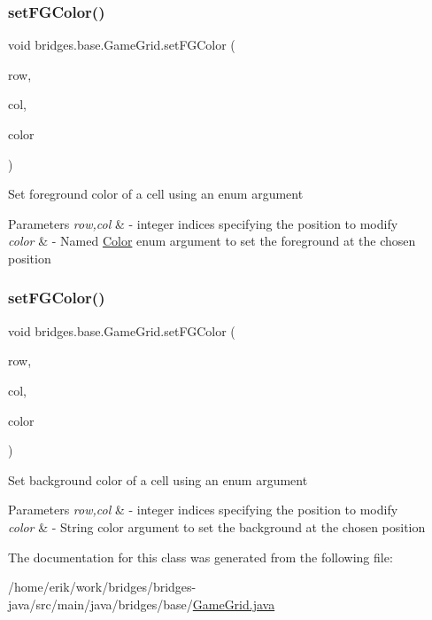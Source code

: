 \subsubsection{\texorpdfstring{set\+F\+G\+Color()}{setFGColor()}\hspace{0.1cm}{\footnotesize\ttfamily [1/2]}}
{\footnotesize\ttfamily void bridges.\+base.\+Game\+Grid.\+set\+F\+G\+Color (\begin{DoxyParamCaption}\item[{Integer}]{row,  }\item[{Integer}]{col,  }\item[{\hyperlink{enumbridges_1_1base_1_1_named_color}{Named\+Color}}]{color }\end{DoxyParamCaption})}

Set foreground color of a cell using an enum argument


\begin{DoxyParams}{Parameters}
{\em row,col} & -\/ integer indices specifying the position to modify \\
\hline
{\em color} & -\/ Named \hyperlink{classbridges_1_1base_1_1_color}{Color} enum argument to set the foreground at the chosen position \\
\hline
\end{DoxyParams}
\mbox{\label{classbridges_1_1base_1_1_game_grid_a860f2669ba46bc7691f4bb5c7adf907b}} 
\subsubsection{\texorpdfstring{set\+F\+G\+Color()}{setFGColor()}\hspace{0.1cm}{\footnotesize\ttfamily [2/2]}}
{\footnotesize\ttfamily void bridges.\+base.\+Game\+Grid.\+set\+F\+G\+Color (\begin{DoxyParamCaption}\item[{Integer}]{row,  }\item[{Integer}]{col,  }\item[{String}]{color }\end{DoxyParamCaption})}

Set background color of a cell using an enum argument


\begin{DoxyParams}{Parameters}
{\em row,col} & -\/ integer indices specifying the position to modify \\
\hline
{\em color} & -\/ String color argument to set the background at the chosen position \\
\hline
\end{DoxyParams}


The documentation for this class was generated from the following file\+:\begin{DoxyCompactItemize}
\item 
/home/erik/work/bridges/bridges-\/java/src/main/java/bridges/base/\hyperlink{_game_grid_8java}{Game\+Grid.\+java}\end{DoxyCompactItemize}
